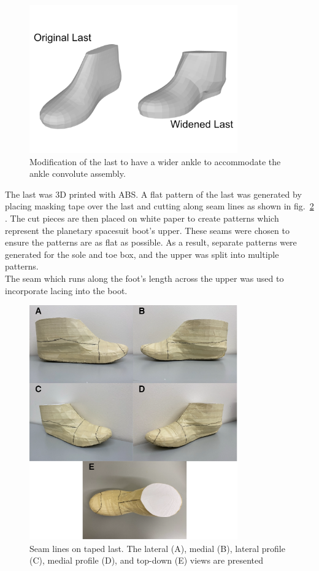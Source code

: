 \documentclass[defaultstyle,11pt]{comps}
\begin{document}
\begin{figure}
\hypertarget{fig:SA3-lastmod}{%
\centering
\includegraphics[width=0.8\textwidth,height=\textheight]{../fig/SA3/LastModification.png}
\caption{Modification of the last to have a wider ankle to accommodate the ankle convolute assembly.}\label{fig:SA3-lastmod}
}
\end{figure}

The last was 3D printed with ABS.
A flat pattern of the last was generated by placing masking tape over the last and cutting along seam lines as shown in fig.~\ref{fig:SA3-lasttape} \citep{Motawi2020}.
The cut pieces are then placed on white paper to create patterns which represent the planetary spacesuit boot's upper.
These seams were chosen to ensure the patterns are as flat as possible.
As a result, separate patterns were generated for the sole and toe box, and the upper was split into multiple patterns.\\
The seam which runs along the foot's length across the upper was used to incorporate lacing into the boot.

\begin{figure}
\hypertarget{fig:SA3-lasttape}{%
\centering
\includegraphics[width=0.8\textwidth,height=\textheight]{../fig/SA3/Last_Taping_Seams.png}
\caption{Seam lines on taped last. The lateral (A), medial (B), lateral profile (C), medial profile (D), and top-down (E) views are presented}\label{fig:SA3-lasttape}
}
\end{figure}
\end{document}
